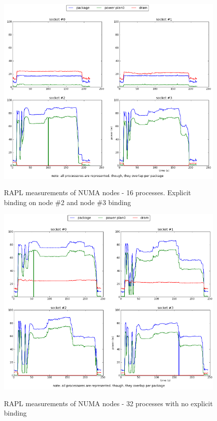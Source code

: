 \begin{figure}[h!]
  \centering
    \includegraphics[width=150mm]{"img/numa/16proc_node2and3"}
    \label{fig:nf_ss}
    \caption{RAPL measurements of NUMA nodes - 16 processes. Explicit binding 
on node \#2 and node \#3 binding}
\end{figure}


\begin{figure}[h!]
  \centering
    \includegraphics[width=150mm]{"img/numa/32proc"}
    \label{fig:nf_ss}
    \caption{RAPL measurements of NUMA nodes - 32 processes with no explicit
binding}
\end{figure}


